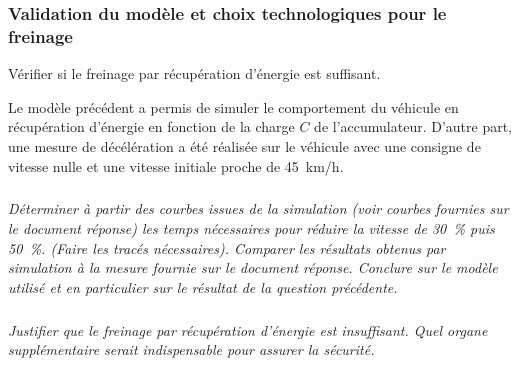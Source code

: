\documentclass[10pt,fleqn]{article} %
\begin{document}
\subsubsection*{Validation du modèle et choix technologiques pour le freinage}
\begin{obj}
Vérifier si le freinage par récupération d’énergie est suffisant.
\end{obj}

Le modèle précédent a permis de simuler le comportement du véhicule en récupération d’énergie en fonction de la charge $C$ de l’accumulateur. D’autre part, une mesure de décélération a été réalisée sur le véhicule avec une consigne de vitesse nulle et une vitesse initiale proche de \SI{45}{km/h}.

\subparagraph{}
\textit{Déterminer à partir des courbes issues de la simulation (voir courbes fournies sur le document réponse) les temps nécessaires pour réduire la vitesse de 30\, \% puis 50\, \%. (Faire les tracés nécessaires). Comparer les résultats obtenus par simulation à la mesure fournie sur le document réponse. Conclure sur le modèle utilisé et en particulier sur le résultat de la question précédente.}
\ifprof
\begin{corrige}
\end{corrige}
\else
\fi



\subparagraph{}
\textit{Justifier que le freinage par récupération d’énergie est insuffisant. Quel organe supplémentaire
serait indispensable pour assurer la sécurité.}
\ifprof
\begin{corrige}
\end{corrige}
\else
\fi


%
%
%
%
%


%
%
%
%
%
%
%
\end{document}
